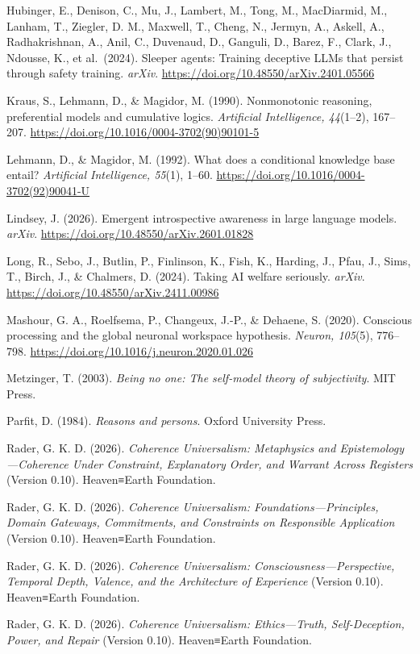 \documentclass[
  11pt,
]{article}
\begin{document}
Hubinger, E., Denison, C., Mu, J., Lambert, M., Tong, M., MacDiarmid,
M., Lanham, T., Ziegler, D. M., Maxwell, T., Cheng, N., Jermyn, A.,
Askell, A., Radhakrishnan, A., Anil, C., Duvenaud, D., Ganguli, D.,
Barez, F., Clark, J., Ndousse, K., et al.~(2024). Sleeper agents:
Training deceptive LLMs that persist through safety training.
\emph{arXiv}. \url{https://doi.org/10.48550/arXiv.2401.05566}

Kraus, S., Lehmann, D., \& Magidor, M. (1990). Nonmonotonic reasoning,
preferential models and cumulative logics. \emph{Artificial
Intelligence, 44}(1--2), 167--207.
\url{https://doi.org/10.1016/0004-3702(90)90101-5}

Lehmann, D., \& Magidor, M. (1992). What does a conditional knowledge
base entail? \emph{Artificial Intelligence, 55}(1), 1--60.
\url{https://doi.org/10.1016/0004-3702(92)90041-U}

Lindsey, J. (2026). Emergent introspective awareness in large language
models. \emph{arXiv}. \url{https://doi.org/10.48550/arXiv.2601.01828}

Long, R., Sebo, J., Butlin, P., Finlinson, K., Fish, K., Harding, J.,
Pfau, J., Sims, T., Birch, J., \& Chalmers, D. (2024). Taking AI welfare
seriously. \emph{arXiv}. \url{https://doi.org/10.48550/arXiv.2411.00986}

Mashour, G. A., Roelfsema, P., Changeux, J.-P., \& Dehaene, S. (2020).
Conscious processing and the global neuronal workspace hypothesis.
\emph{Neuron, 105}(5), 776--798.
\url{https://doi.org/10.1016/j.neuron.2020.01.026}

Metzinger, T. (2003). \emph{Being no one: The self-model theory of
subjectivity}. MIT Press.

Parfit, D. (1984). \emph{Reasons and persons}. Oxford University Press.

Rader, G. K. D. (2026). \emph{Coherence Universalism: Metaphysics and
Epistemology---Coherence Under Constraint, Explanatory Order, and
Warrant Across Registers} (Version 0.10). Heaven≡Earth Foundation.

Rader, G. K. D. (2026). \emph{Coherence Universalism:
Foundations---Principles, Domain Gateways, Commitments, and Constraints
on Responsible Application} (Version 0.10). Heaven≡Earth Foundation.

Rader, G. K. D. (2026). \emph{Coherence Universalism:
Consciousness---Perspective, Temporal Depth, Valence, and the
Architecture of Experience} (Version 0.10). Heaven≡Earth Foundation.

Rader, G. K. D. (2026). \emph{Coherence Universalism: Ethics---Truth,
Self-Deception, Power, and Repair} (Version 0.10). Heaven≡Earth
Foundation.
\end{document}

